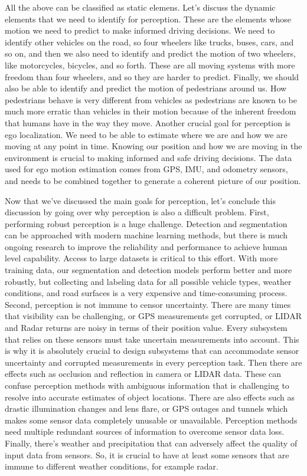 All the above can be classified as static elemens. Let's discuss the dynamic elements that we need to identify for perception. 
These are the elements whose motion we need to predict to make informed driving decisions. 
We need to identify other vehicles on the road, so four wheelers like trucks, buses, cars, and so on, and then we also need to identify and predict the motion of two wheelers, like motorcycles, bicycles, and so forth. These are all moving systems with more freedom than four wheelers, and so they are harder to predict. 
Finally, we should also be able to identify and predict the motion of pedestrians around us. 
How pedestrians behave is very different from vehicles as pedestrians are known to be much more erratic than vehicles in their motion because of the inherent freedom that humans have in the way they move. Another crucial goal for perception is ego localization. 
We need to be able to estimate where we are and how we are moving at any point in time. 
Knowing our position and how we are moving in the environment is crucial to making informed and safe driving decisions. 
The data used for ego motion estimation comes from GPS, IMU, and odometry sensors, and needs to be combined together to generate a coherent picture of our position. 
 

Now that we've discussed the main goals for perception, let's conclude this discussion by going over why perception is also a difficult problem. First, performing robust perception is a huge challenge. Detection and segmentation can be approached with modern machine learning methods, but there is much ongoing research to improve the reliability and performance to achieve human level capability. Access to large datasets is critical to this effort. 
With more training data, our segmentation and detection models perform better and more robustly, 
but collecting and labeling data for all possible vehicle types, weather conditions, and road surfaces is a very expensive and time-consuming process. 
Second, perception is not immune to censor uncertainty. There are many times that visibility can be challenging, or GPS measurements get corrupted, or LIDAR and Radar returns are noisy in terms of their position value. Every subsystem that relies on these sensors must take uncertain measurements into account. 
This is why it is absolutely crucial to design subsystems that can accommodate sensor uncertainty and corrupted measurements in every perception task. 
Then there are effects such as occlusion and reflection in camera or LIDAR data. 
These can confuse perception methods with ambiguous information that is challenging to resolve into accurate estimates of object locations. 
There are also effects such as drastic illumination changes and lens flare, or GPS outages and tunnels which makes some sensor data completely unusable or unavailable. 
Perception methods need multiple redundant sources of information to overcome sensor data loss. 
Finally, there's weather and precipitation that can adversely affect the quality of input data from sensors. 
So, it is crucial to have at least some sensors that are immune to different weather conditions, for example radar. 


